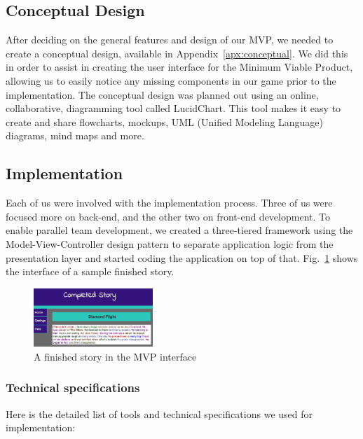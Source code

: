 \documentclass{sigchi}
\begin{document}
\subsection{Conceptual Design}
After deciding on the general features and design of our MVP, we needed to create a conceptual design, available in Appendix~\ref{apx:conceptual}. We did this in order to assist in creating the user interface for the Minimum Viable Product, allowing us to easily notice any missing components in our game prior to the implementation. The conceptual design was planned out using an online, collaborative, diagramming tool called LucidChart. This tool makes it easy to create and share flowcharts, mockups, UML (Unified Modeling Language) diagrams, mind maps and more.

\subsection{Implementation}
Each of us were involved with the implementation process. Three of us were focused more on back-end, and the other two on front-end development. To enable parallel team development, we created a three-tiered framework using the Model-View-Controller design pattern to separate application logic from the presentation layer and started coding the application on top of that. Fig.\@~\ref{fig:mvp} shows the interface of a sample finished story.

\begin{figure}[H]
\centering
\includegraphics[width=0.4\textwidth]{mvp.png}
\caption{A finished story in the MVP interface}
\label{fig:mvp}
\end{figure}

\subsubsection{Technical specifications}
Here is the detailed list of tools and technical specifications we used for implementation:
\end{document}
